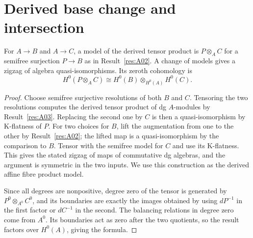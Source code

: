\section{Derived base change and intersection}

\begin{proposition}\label{res:A04}
For \(A\to B\) and \(A\to C\), a model of the derived tensor product
is \(P\otimes_A C\) for a semifree surjection \(P\to B\) as in
Result~\ref{res:A02}. A change of models gives a zigzag of algebra
quasi-isomorphisms. Its zeroth cohomology is
\[
 H^0(P\otimes_A C)
   \cong H^0(B)\otimes_{H^0(A)} H^0(C).
\]
\end{proposition}
\begin{proof}
Choose semifree surjective resolutions of both \(B\) and \(C\).
Tensoring the two resolutions computes the derived tensor product of
dg \(A\)-modules by Result~\ref{res:A03}. Replacing the second one
by \(C\) is then a quasi-isomorphism by K-flatness of \(P\).
For two choices for \(B\), lift the augmentation from one to the
other by Result~\ref{res:A02}; the lifted map is a quasi-isomorphism
by the comparison to \(B\). Tensor with the semifree model for \(C\)
and use its K-flatness. This gives the stated zigzag of maps of
commutative dg algebras, and the argument is symmetric in the two
inputs. We use this construction as the derived affine fibre product
model.

Since all degrees are nonpositive, degree zero of the tensor is
generated by \(P^0\otimes_{A^0}C^0\), and its boundaries are exactly
the images obtained by using \(dP^{-1}\) in the first factor or
\(dC^{-1}\) in the second. The balancing relations in degree zero
come from \(A^0\). Its boundaries act as zero after the two
quotients, so the result factors over \(H^0(A)\), giving the formula.
\end{proof}

